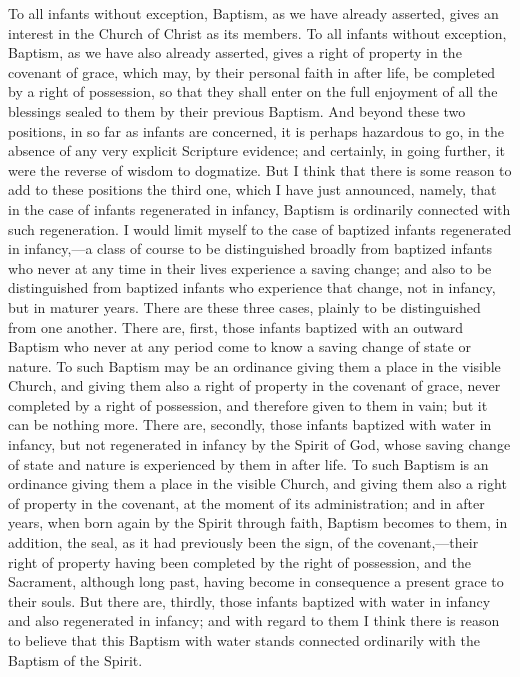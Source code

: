 \documentclass[]{book}
\begin{document}
To all infants without exception, Baptism, as we have already asserted, gives an interest in the Church of Christ as its members. To all infants without exception, Baptism, as we have also already asserted, gives a right of property in the covenant of grace, which may, by their personal faith in after life, be completed by a right of possession, so that they shall enter on the full enjoyment of all the blessings sealed to them by their previous Baptism. And beyond these two positions, in so far as infants are concerned, it is perhaps hazardous to go, in the absence of any very explicit Scripture evidence; and certainly, in going further, it were the reverse of wisdom to dogmatize. But I think that there is some reason to add to these positions the third one, which I have just announced, namely, that in the case of infants regenerated in infancy, Baptism is ordinarily connected with such regeneration. I would limit myself to the case of baptized infants regenerated in infancy,---a class of course to be distinguished broadly from baptized infants who never at any time in their lives experience a saving change; and also to be distinguished from baptized infants who experience that change, not in infancy, but in maturer years. There are these three cases, plainly to be distinguished from one another. There are, first, those infants baptized with an outward Baptism who never at any period come to know a saving change of state or nature. To such Baptism may be an ordinance giving them a place in the visible Church, and giving them also a right of property in the covenant of grace, never completed by a right of possession, and therefore given to them in vain; but it can be nothing more. There are, secondly, those infants baptized with water in infancy, but not regenerated in infancy by the Spirit of God, whose saving change of state and nature is experienced by them in after life. To such Baptism is an ordinance giving them a place in the visible Church, and giving them also a right of property in the covenant, at the moment of its administration; and in after years, when born again by the Spirit through faith, Baptism becomes to them, in addition, the seal, as it had previously been the sign, of the covenant,---their right of property having been completed by the right of possession, and the Sacrament, although long past, having become in consequence a present grace to their souls. But there are, thirdly, those infants baptized with water in infancy and also regenerated in infancy; and with regard to them I think there is reason to believe that this Baptism with water stands connected ordinarily with the Baptism of the Spirit.
\end{document}
